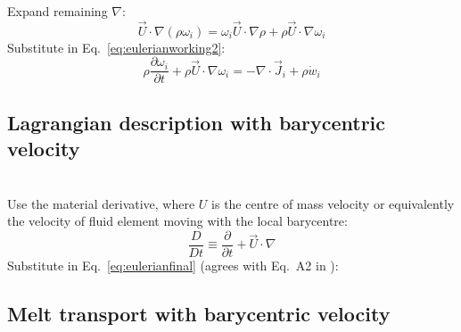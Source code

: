 Expand remaining $\nabla$:
\begin{equation}
\vec{U} \cdot \nabla(\rho \omega_i) = \omega_i \vec{U} \cdot \nabla \rho + \rho \vec{U} \cdot \nabla \omega_i
\label{eq:eulerianworking2}
\end{equation}
Substitute in Eq.~\ref{eq:eulerianworking2}:
\begin{equation}
\rho \frac{\partial \omega_i}{\partial t} + \rho \vec{U} \cdot \nabla \omega_i = - \nabla \cdot \vec{J}_i + \rho \dot{w}_i
\end{equation}
\subsection{Lagrangian description with barycentric velocity}
\\

\noindent
Use the material derivative, where $U$ is the centre of mass velocity or equivalently the velocity of fluid element moving with the local barycentre:
\begin{equation}
\frac{D}{D t} \equiv \frac{\partial}{\partial t} + \vec{U} \cdot \nabla
\end{equation}
Substitute in Eq.~\ref{eq:eulerianfinal} (agrees with Eq.~A2 in \cite{ABE95}):
\subsection{Melt transport with barycentric velocity}
\\

